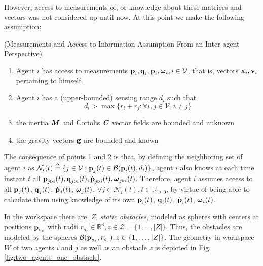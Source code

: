 However, access to measurements of, or knowledge about these matrices and
vectors was not considered up until now. At this point we make the following
assumption:

\begin{gg_box}
\begin{assumption} (Measurements and Access to Information Assumption From an
  Inter-agent Perspective)
  \begin{enumerate}

    \item Agent $i$ has access to measurements
      $\bm{\mathbf{p}}_i, \bm{\mathbf{q}}_i, \dot{\bm{\mathbf{p}}}_i, \bm{\mathbf{\omega}}_i, i\in\mathcal{V}$,
      that is, vectors $\bm{\mathbf{x}}_i, \bm{\mathbf{v}}_i$ pertaining to himself,

    \item Agent $i$ has a (upper-bounded) sensing range $d_i$ such that
      $$d_i > \max\{r_i + r_j : \forall i,j \in \mathcal{V}, i \neq j\}$$

    \item the inertia $\bm{\mathit{M}}$ and Coriolis $\bm{\mathit{C}}$ vector fields are
      bounded and unknown

    \item the gravity vectors $\bm{\mathbf{g}}$ are bounded and known

  \end{enumerate}
\end{assumption}
\end{gg_box}

The consequence of points 1 and 2 is that, by defining the neighboring set of
agent $i$ as
$\mathcal{N}_i(t) \overset{\Delta}{=} \{j\in\mathcal{V} : \bm{\mathbf{p}}_j(t)\in\mathcal{B}(\bm{\mathbf{p}}_i(t), d_i)\}$,
agent $i$ also knows at each time instant $t$ all
$\bm{\mathbf{p}}_{j \triangleright i}(t), \bm{\mathbf{q}}_{j \triangleright i}(t),
\dot{\bm{\mathbf{p}}}_{j \triangleright i}(t), \bm{\mathbf{\omega}}_{j \triangleright i}(t)$.
Therefore, agent $i$ assumes access to all
$\bm{\mathbf{p}}_{j}(t)$, $\bm{\mathbf{q}}_{j}(t)$, $\dot{\bm{\mathbf{p}}}_j(t)$,
$\bm{\mathbf{\omega}}_j(t)$, $\forall j\in \mathcal{N}_i(t),t\in\mathbb{R}_{\geq 0}$,
by virtue of being able to calculate them using knowledge of its own
$\bm{\mathbf{p}}_i(t)$, $\bm{\mathbf{q}}_i(t)$, $\dot{\bm{\mathbf{p}}}_i(t)$, $\bm{\mathbf{\omega}}_i(t)$.



In the workspace there are $|Z|$ \textit{static obstacles}, modeled as
spheres with centers at positions $\bm{\mathbf{p}}_{o_z}$ with radii
$r_{o_z}\in \mathbb{R}^3, z \in \mathcal{Z} = \{1,\dots,|Z| \}$.
Thus, the obstacles are modeled by the spheres
$\mathcal{B}(\bm{\mathbf{p}}_{o_z}, r_{o_z}), z \in \{1,\dots,|Z|\}$. The geometry in
workspace $W$ of two agents $i$ and $j$ as well as an obstacle $z$ is depicted
in Fig. \ref{fig:two_agents_one_obstacle}.

